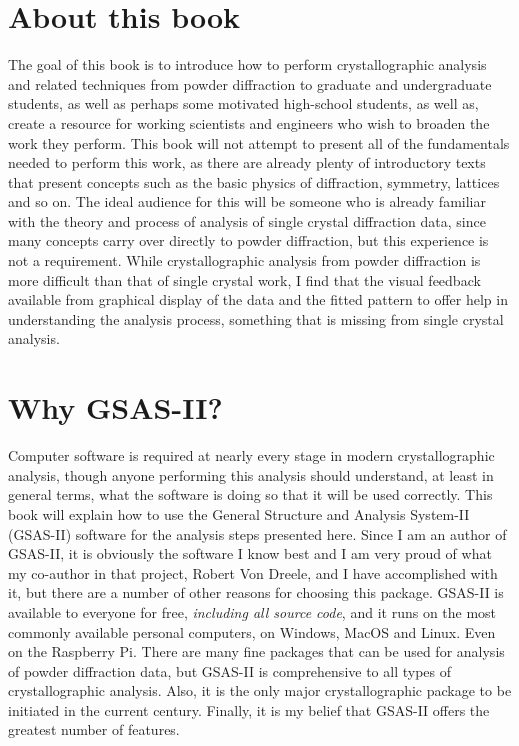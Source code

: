 \section*{About this book}

 The goal of this book is to introduce how to perform crystallographic analysis and related techniques from powder diffraction to graduate and undergraduate students, as well as perhaps some motivated high-school students, as well as, create a resource for working scientists and engineers who wish to broaden the work they perform. This book will not attempt to present all of the fundamentals needed to perform this work, as there are already plenty of introductory texts that present concepts such as the basic physics of diffraction, symmetry, lattices and so on. The ideal audience for this will be someone who is already familiar with the theory and process of analysis of single crystal diffraction data, since many concepts carry over directly to powder diffraction, but this experience is not a requirement. While crystallographic analysis from powder diffraction is more difficult than that of single crystal work, I find that the visual feedback available from graphical display of the data and the fitted pattern to offer help in understanding the analysis process, something that is missing from single crystal analysis.

\section*{Why GSAS-II?}

Computer software is required at nearly every stage in modern crystallographic analysis, though anyone performing this analysis should understand, at least in general terms, what the software is doing so that it will be used correctly. 
This book will explain how to use the General Structure and Analysis System-II (GSAS-II) software for the analysis steps presented here. 
Since I am an author of GSAS-II, it is obviously the software I know best and I am very proud of what my co-author in that project, Robert Von Dreele, and I have accomplished with it, but there are a number of other reasons for choosing this package. GSAS-II is available to everyone for free, \textit{including all source code}, and it runs on the most commonly available personal computers, on Windows, MacOS and Linux. Even on the Raspberry Pi. 
There are many fine packages that can be used for analysis of powder diffraction data, but GSAS-II is  comprehensive to all types of crystallographic analysis. Also, it is the only major crystallographic package to be initiated in the current century. Finally, it is my belief that GSAS-II offers the greatest number of features. 

